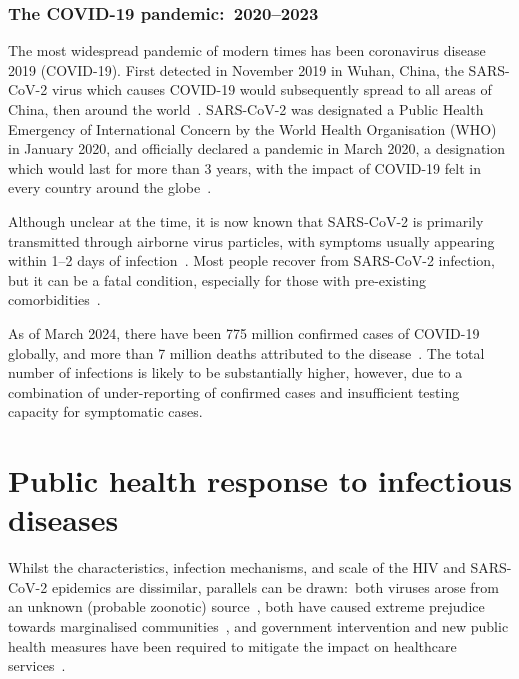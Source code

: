 \subsubsection{The COVID-19 pandemic:\ 2020--2023}

The most widespread pandemic of modern times has been coronavirus disease 2019 (COVID-19). First detected in November 2019 in Wuhan, China, the SARS-CoV-2 virus which causes COVID-19 would subsequently spread to all areas of China, then around the world~\parencite{South_China_Morning_Post2020-dv}. SARS-CoV-2 was designated a Public Health Emergency of International Concern by the World Health Organisation (WHO) in January 2020, and officially declared a pandemic in March 2020, a designation which would last for more than 3 years, with the impact of COVID-19 felt in every country around the globe~\parencite{World_Health_Organisation2020-uq, World_Health_Organisation2023-yr}.

Although unclear at the time, it is now known that SARS-CoV-2 is primarily transmitted through airborne virus particles, with symptoms usually appearing within 1--2 days of infection~\parencite{UK-Health-Security-Agency2022-vp}. Most people recover from SARS-CoV-2 infection, but it can be a fatal condition, especially for those with pre-existing comorbidities~\parencite{Docherty2021-es}.

As of March 2024, there have been 775 million confirmed cases of COVID-19 globally, and more than 7 million deaths attributed to the disease~\parencite{World_Health_Organization2020-lp}. The total number of infections is likely to be substantially higher, however, due to a combination of under-reporting of confirmed cases and insufficient testing capacity for symptomatic cases.

\section{Public health response to infectious diseases}

Whilst the characteristics, infection mechanisms, and scale of the HIV and SARS-CoV-2 epidemics are dissimilar, parallels can be drawn:\ both viruses arose from an unknown (probable zoonotic) source~\parencite{Contini2020-gk}, both have caused extreme prejudice towards marginalised communities~\parencite{Hibbert2018-hz, Bhanot2020-tp}, and government intervention and new public health measures have been required to mitigate the impact on healthcare services~\parencite{Brauner2021-np, Brown2018-nk}.


